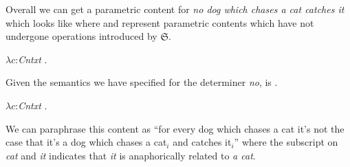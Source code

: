 


Overall we can get a parametric content for \textit{no dog which
  chases a cat catches it} which looks like \nexteg{} where
 \usebox{\boxone}
and \usebox{\boxtwo} represent parametric contents
which have not undergone operations introduced by $\mathfrak{S}$.
\begin{ex} 
  $\lambda c$:\textit{Cntxt} . 
\end{ex} 
Given the semantics we have specified for the determiner \textit{no},
\preveg{} is \nexteg{}.
\begin{ex} 
  $\lambda c$:\textit{Cntxt} . 
\end{ex} 
We can paraphrase this content as ``for every dog which chases a cat
it's not the case that it's a dog which chases a cat$_i$ and catches
it$_i$'' where the subscript on \textit{cat} and \textit{it} indicates
that \textit{it} is anaphorically related to \textit{a cat}.


